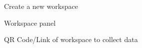 \begin{figure}[ht]
    \centering
    \caption{Create a new workspace}
    \label{fig:create-workspace}
\end{figure}

\begin{figure}[ht]
    \centering
    \caption{Workspace panel}
    \label{fig:workspace-overview}
\end{figure}

\begin{figure}[ht]
    \centering
    \caption{QR Code/Link of workspace to collect data}
    \label{fig:workspace-link}
\end{figure}

